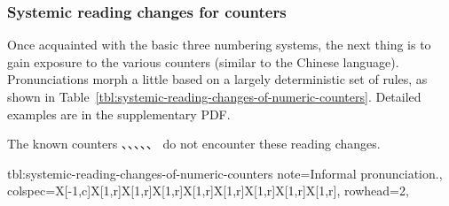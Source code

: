 \documentclass[../nihongo-gakushuu-kyouzai.tex]{subfiles}
\begin{document}
\subsubsection{Systemic reading changes for counters} \label{sec:systemic-reading-changes-for-counters}
Once acquainted with the basic three numbering systems, the next thing is to gain exposure to the various counters (similar to the Chinese language). Pronunciations morph a little based on a largely deterministic set of rules, as shown in Table~\ref{tbl:systemic-reading-changes-of-numeric-counters}. Detailed examples are in the supplementary PDF.

The known counters 、、、、、 do not encounter these reading changes.

{tbl:systemic-reading-changes-of-numeric-counters}  %
{
    note{\dagger}={Informal pronunciation.},
}  %
{
    colspec={X[-1,c]X[1,r]X[1,r]X[1,r]X[1,r]X[1,r]X[1,r]X[1,r]X[1,r]},
    rowhead=2,
}  %
\end{document}
